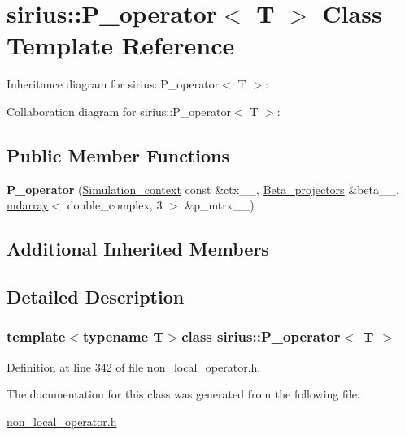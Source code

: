 \hypertarget{classsirius_1_1_p__operator}{}\section{sirius\+:\+:P\+\_\+operator$<$ T $>$ Class Template Reference}
\label{classsirius_1_1_p__operator}


Inheritance diagram for sirius\+:\+:P\+\_\+operator$<$ T $>$\+:


Collaboration diagram for sirius\+:\+:P\+\_\+operator$<$ T $>$\+:
\subsection*{Public Member Functions}
\begin{DoxyCompactItemize}
\item 
\hypertarget{classsirius_1_1_p__operator_a4d446971d85a6c32624c1f8a08ba3af6}{}{\bfseries P\+\_\+operator} (\hyperlink{classsirius_1_1_simulation__context}{Simulation\+\_\+context} const \&ctx\+\_\+\+\_\+, \hyperlink{classsirius_1_1_beta__projectors}{Beta\+\_\+projectors} \&beta\+\_\+\+\_\+, \hyperlink{classsddk_1_1mdarray}{mdarray}$<$ double\+\_\+complex, 3 $>$ \&p\+\_\+mtrx\+\_\+\+\_\+)\label{classsirius_1_1_p__operator_a4d446971d85a6c32624c1f8a08ba3af6}

\end{DoxyCompactItemize}
\subsection*{Additional Inherited Members}


\subsection{Detailed Description}
\subsubsection*{template$<$typename T$>$class sirius\+::\+P\+\_\+operator$<$ T $>$}



Definition at line 342 of file non\+\_\+local\+\_\+operator.\+h.



The documentation for this class was generated from the following file\+:\begin{DoxyCompactItemize}
\item 
\hyperlink{non__local__operator_8h}{non\+\_\+local\+\_\+operator.\+h}\end{DoxyCompactItemize}
